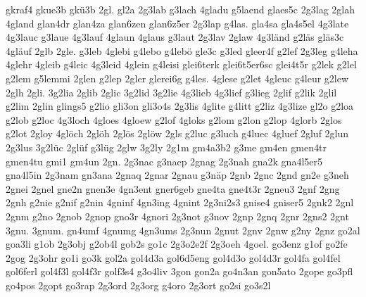 {    gkraf4
    gkue3b
    gkü3b
    2gl.
    gl2a
    2g3lab
    g3lach
    4gladu
    g5laend
    glaes5c
    2g3lag
    2glah
    4gland
    glan4dr
    glan4za
    glan6zen
    glan6z5er
    2g3lap
    g4las.
    gla4sa
    gla4s5el
    4g3late
    4g3lauc
    g3laue
    4g3lauf
    4glaun
    4glaus
    g3laut
    2g3lav
    2glaw
    4g3länd
    g2läs
    gläs3c
    4gläuf
    2glb
    2gle.
    g3leb
    4glebi
    g4lebo
    g4lebö
    gle3c
    g3led
    gleer4f
    g2lef
    2g3leg
    g4leha
    4glehr
    4gleib
    g4leic
    4g3leid
    4glein
    g4leisi
    glei6terk
    glei6t5er6sc
    glei4t5r
    g2lek
    g2lel
    g2lem
    g5lemmi
    2glen
    g2lep
    2gler
    glerei6g
    g4les.
    4glese
    g2let
    4gleuc
    g4leur
    g2lew
    2glh
    2gli.
    3g2lia
    2glib
    2glic
    3g2lid
    3g2lie
    4g3lieb
    4g3lief
    g3lieg
    2glif
    g2lik
    2glil
    g2lim
    2glin
    glings5
    g2lio
    gli3on
    gli3o4s
    2g3lis
    4glite
    g4litt
    g2liz
    4g3lize
    gl2o
    g2loa
    g2lob
    g2loc
    4g3loch
    4gloes
    4gloew
    g2lof
    4gloks
    g2lom
    g2lon
    g2lop
    4glorb
    2glos
    g2lot
    2gloy
    4glöch
    2glöh
    2glös
    2glöw
    2gls
    g2luc
    g3luch
    g4luec
    4gluef
    2gluf
    2glun
    2g3lus
    3g2lüc
    2glüf
    g3lüg
    2glw
    3g2ly
    2g1m
    gm4a3b2
    g3me
    gm4en
    gmen4tr
    gmen4tu
    gmi1
    gm4un
    2gn.
    2g3nac
    g3naep
    2gnag
    2g3nah
    gna2k
    gna4l5er5
    gna4l5in
    2g3nam
    gn3ana
    2gnaq
    2gnar
    2gnau
    g3näp
    2gnb
    2gnc
    2gnd
    gn2e
    g3neh
    2gnei
    2gnel
    gne2n
    gnen3e
    4gn3ent
    gner6geb
    gne4ta
    gne4t3r
    2gneu3
    2gnf
    2gng
    2gnh
    g2nie
    g2nif
    g2nin
    4gninf
    4gn3ing
    4gnint
    2g3ni2s3
    gnise4
    gniser5
    2gnk2
    2gnl
    2gnm
    g2no
    2gnob
    2gnop
    gno3r
    4gnori
    2g3not
    g3nov
    2gnp
    2gnq
    2gnr
    2gns2
    2gnt
    3gnu.
    3gnum.
    gn4umf
    4gnumg
    4gn3ums
    2g3nun
    2gnut
    2gnv
    2gnw
    g2ny
    2gnz
    go2al
    goa3li
    g1ob
    2g3obj
    g2ob4l
    gob2s
    go1c
    2g3o2e2f
    2g3oeh
    4goel.
    go3enz
    g1of
    go2fe
    2gog
    2g3ohr
    go1i
    go3k
    gol2a
    gol4d3a
    gol6d5eng
    gol4d3o
    gol4d3r
    gol4fa
    gol4fel
    gol6ferl
    gol4f3l
    gol4f3r
    golf3s4
    g3o4liv
    3gon
    gon2a
    go4n3an
    gon5ato
    2gope
    go3pfl
    go4pos
    2gopt
    go3rap
    2g3ord
    2g3org
    g4oro
    2g3ort
    go2si
    go3s2l
}
